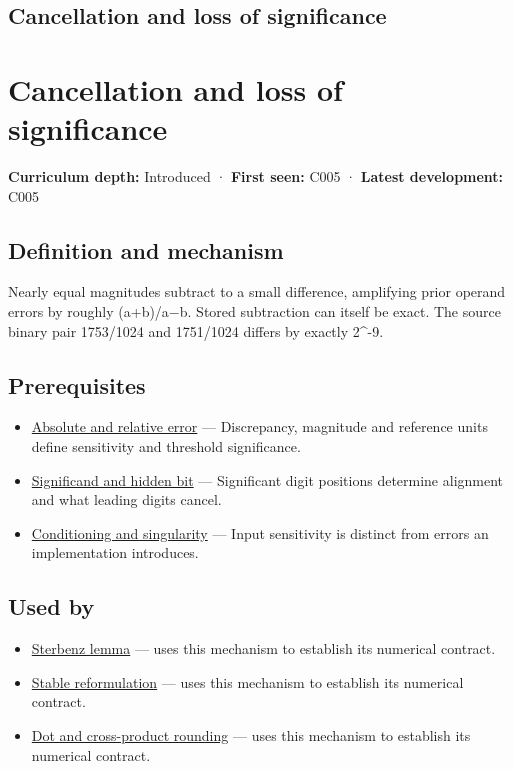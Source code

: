 \hypertarget{appendix-a2773a6a2f9d}{}
\section*{Cancellation and loss of significance}
\chapter{Cancellation and loss of significance}\label{appendix-a2773a6a2f9d-cancellation-and-loss-of-significance}

\textbf{Curriculum depth:} Introduced · \textbf{First seen:} C005 · \textbf{Latest development:} C005

\section{Definition and mechanism}\label{appendix-a2773a6a2f9d-definition-and-mechanism}

Nearly equal magnitudes subtract to a small difference, amplifying prior operand errors by roughly (\textbar a\textbar+\textbar b\textbar)/\textbar a−b\textbar. Stored subtraction can itself be exact. The source binary pair 1753/1024 and 1751/1024 differs by exactly 2\^{}-9.

\section{Prerequisites}\label{appendix-a2773a6a2f9d-prerequisites}

\begin{itemize}
\tightlist
\item
  \hyperref[appendix-3ae74e89b4e6]{Absolute and relative error} --- Discrepancy, magnitude and reference units define sensitivity and threshold significance.
\item
  \hyperref[appendix-a24fd710cf67]{Significand and hidden bit} --- Significant digit positions determine alignment and what leading digits cancel.
\item
  \hyperref[appendix-8f6a01f284a7]{Conditioning and singularity} --- Input sensitivity is distinct from errors an implementation introduces.
\end{itemize}

\section{Used by}\label{appendix-a2773a6a2f9d-used-by}

\begin{itemize}
\tightlist
\item
  \hyperref[appendix-399b7ad53f39]{Sterbenz lemma} --- uses this mechanism to establish its numerical contract.
\item
  \hyperref[appendix-d7f8ba961670]{Stable reformulation} --- uses this mechanism to establish its numerical contract.
\item
  \hyperref[appendix-5aef4f13483a]{Dot and cross-product rounding} --- uses this mechanism to establish its numerical contract.
\end{itemize}

